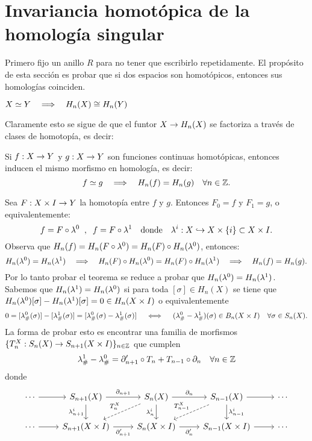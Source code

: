 \documentclass[../../topologia_algebraica]{subfiles}
\begin{document}
\section{Invariancia homot\'opica de la homolog\'ia singular}\label{sec:invariancia}


Primero fijo un anillo $R$ para no tener que escribirlo repetidamente.
El prop\'osito de esta secci\'on es probar que si dos espacios son homot\'opicos, entonces sus
homolog\'ias coinciden.

\begin{thm}\label{thm:invariancia_homologia}
  $X\simeq Y \quad\Longrightarrow\quad H_n(X)\cong H_n(Y)$
\end{thm}

Claramente esto se sigue de que el funtor $X\rightarrow H_n(X)$ se factoriza a trav\'es de clases de
homotop\'ia, es decir:

\begin{thm}\label{thm:invariancia_homologia_dos}
  Si $f:X\rightarrow Y$ y $g:X\rightarrow Y$ son funciones continuas homot\'opicas, entonces inducen el mismo
  morfismo en homolog\'ia, es decir:
  \[
    f\simeq g \quad\Longrightarrow\quad H_n(f)=H_n(g)\quad\forall n\in\mathbb{Z}.
  \]
\end{thm}

Sea $F:X\times I\rightarrow Y$ la homotop\'ia entre $f$ y $g$. Entonces $F_0=f$ y $F_1=g$, o
equivalentemente:
\[
  f=F\circ\lambda^0 \;\; , \;\; f=F\circ\lambda^1 \quad\text{donde}\quad
  \lambda^i:X\hookrightarrow X\times\{i\}\subset X\times I.
\]
Observa que $H_n(f)=H_n(F\circ \lambda^0)=H_n(F)\circ H_n(\lambda^0)$, entonces:
\[
  H_n(\lambda^0)=H_n(\lambda^1) \quad\Longrightarrow\quad
  H_n(F)\circ H_n(\lambda^0)=H_n(F)\circ H_n(\lambda^1) \quad\Longrightarrow\quad
  H_n(f)=H_n(g).
\]
Por lo tanto probar el teorema se reduce a probar que $H_n(\lambda^0)=H_n(\lambda^1)$.
Sabemos que $H_n(\lambda^1)=H_n(\lambda^0)$ si para toda $[\sigma]\in H_n(X)$ se tiene
que $H_n(\lambda^0)[\sigma]-H_n(\lambda^1)[\sigma]=0\in H_n(X\times I)$ o equivalentemente
\[
  0=[\lambda_{\#}^0(\sigma)]-[\lambda_{\#}^1(\sigma)]=[\lambda_{\#}^0(\sigma)-\lambda_{\#}^1(\sigma)]
  \quad\iff\quad (\lambda_{\#}^0-\lambda_{\#}^1)(\sigma)\in B_n(X\times I)\quad\forall\sigma\in S_n(X).
\]
La forma de probar esto es encontrar una familia de morfismos
$\{T_n^X:S_n(X)\rightarrow S_{n+1}(X\times I)\}_{n\in\mathbb{Z}}$ que cumplen
\begin{equation}
  \label{eq:homotopia_complejos_lambda}
  \lambda_{\#}^1-\lambda_{\#}^0=\partial'_{n+1}\circ T_n+T_{n-1}\circ\partial_n \quad\forall n\in\mathbb{Z}
\end{equation}
donde
\[
  \begin{tikzcd}
    \cdots \arrow[r] & S_{n+1}(X) \arrow[r,"\partial_{n+1}"] \arrow[d,"\la^i_{n+1}"'] &
    S_n(X) \arrow[r,"\partial_n"] \arrow[d,"\la^i_n"'] \arrow[ld,dashed,"T^X_n"'] &
    S_{n-1}(X) \arrow[r] \arrow[ld,dashed,"T^X_{n-1}"'] \arrow[d,"\la_{n-1}^i"] & \cdots \\
    \cdots \arrow[r] & S_{n+1}(X\times I) \arrow[r,"\partial'_{n+1}"'] &
    S_n(X\times I) \arrow[r,"\partial'_n"'] & S_{n-1}(X\times I) \arrow[r] & \cdots
  \end{tikzcd}
\]
\end{document}

